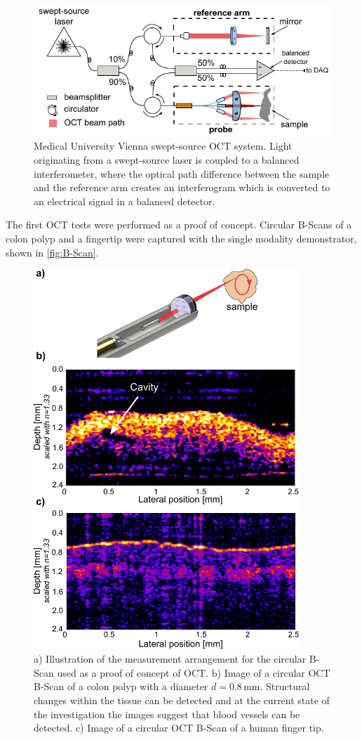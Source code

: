 \begin{figure}[h!]\centering \includegraphics[width=12cm]{figures/50_Measurements/oct/octSetupVienna.pdf}
      \caption{Medical University Vienna swept-source OCT system. Light originating from a swept-source laser is coupled to a balanced interferometer, where the optical path difference between the sample and the reference arm creates an interferogram which is converted to an electrical signal in a balanced detector.}
      \label{fig:OCTsetup}
\end{figure}

The first OCT tests were performed as a proof of concept. Circular B-Scans of a colon polyp and a fingertip were captured with the single modality demonstrator, shown in \autoref{fig:B-Scan}. 

\begin{figure}[h!]\centering \includegraphics[width=10cm]{figures/50_Measurements/oct/OCT_Measurement_arrangement.pdf}
      \caption{a) Illustration of the measurement arrangement for the circular B-Scan used as a proof of concept of OCT. b) Image of a circular OCT B-Scan of a colon polyp with a diameter $d=0.8\,\text{mm}$. Structural changes within the tissue can be detected and at the current state of the investigation the images suggest that blood vessels can be detected.
      c) Image of a circular OCT B-Scan of a human finger tip.}
      \label{fig:B-Scan}
\end{figure}